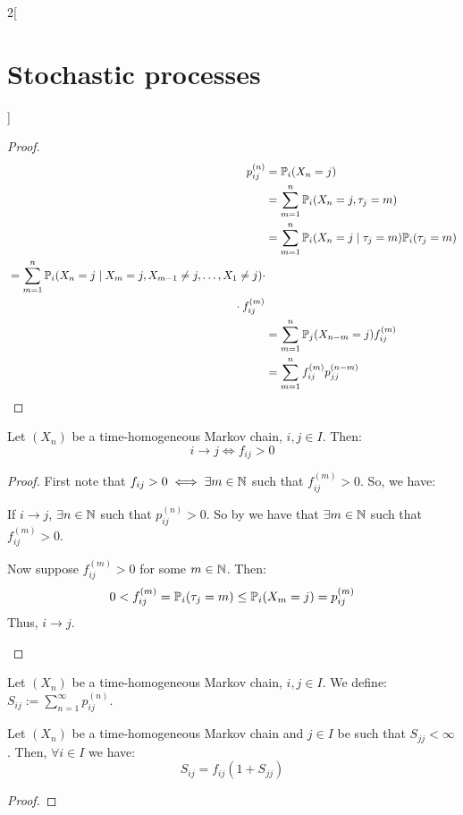 \documentclass[../../../main_math.tex]{subfiles}
\begin{document}
\begin{multicols}{2}[\section{Stochastic processes}]
\begin{proof}
    \begin{align*}
      p_{ij}^{(n)} & =\Prob_i(X_n=j)                                               \\
                   & =\sum_{m=1}^n \Prob_i(X_n=j,\tau_j=m)                         \\
                   & =\sum_{m=1}^n \Prob_i(X_n=j\mid\tau_j=m)\Prob_i(\tau_j=m)     \\
      \begin{split}
         & =\sum_{m=1}^n \Prob_i(X_n=j\mid X_m=j,X_{m-1}\ne j,\ldots, X_1\ne j)\cdot \\
         & \hspace{7cm}\cdot f_{ij}^{(m)}
      \end{split} \\
                   & =\sum_{m=1}^n \Prob_j(X_{n-m}=j)f_{ij}^{(m)}                  \\
                   & =\sum_{m=1}^nf_{ij}^{(m)}p_{jj}^{(n-m)}
    \end{align*}
  \end{proof}
  \begin{proposition}
    Let $(X_n)$ be a time-homogeneous Markov chain, $i, j\in I$. Then:
    $$
      i\to j\iff f_{ij}>0
    $$
  \end{proposition}
  \begin{proof}
    First note that $f_{ij}>0\iff \exists m\in\mathbb{N}$ such that $f_{ij}^{(m)}>0$. So, we have:
    \begin{itemizeiff}
      If $i\to j$, $\exists n\in\mathbb{N}$ such that $p_{ij}^{(n)}>0$. So by  we have that $ \exists m\in\mathbb{N}$ such that $f_{ij}^{(m)}>0$.
      \item Now suppose $f_{ij}^{(m)}>0$ for some $m\in\mathbb{N}$. Then:
      $$
        0<f_{ij}^{(m)}=\mathbb{P}_i(\tau_j=m)\leq \mathbb{P}_i(X_m=j)=p_{ij}^{(m)}
      $$
      Thus, $i\to j$.
    \end{itemizeiff}
  \end{proof}
  \begin{definition}
    Let $(X_n)$ be a time-homogeneous Markov chain, $i, j\in I$. We define: $S_{ij}:=\sum_{n=1}^{\infty}p_{ij}^{(n)}$.
  \end{definition}
  \begin{lemma}\label{SP:lemaPrerec}
    Let $(X_n)$ be a time-homogeneous Markov chain and $j\in I$ be such that $S_{jj}<\infty$. Then, $\forall i\in I$ we have:
    $$
      S_{ij}=f_{ij}(1+S_{jj})
    $$
  \end{lemma}
  \begin{proof}

\end{proof}
\end{multicols}
\end{document}
